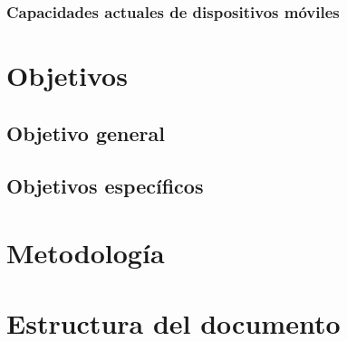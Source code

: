\subsubsection{Capacidades actuales de dispositivos móviles}

\section{Objetivos}

\subsection{Objetivo general}

\subsection{Objetivos específicos}

\section{Metodología}

\section{Estructura del documento}
